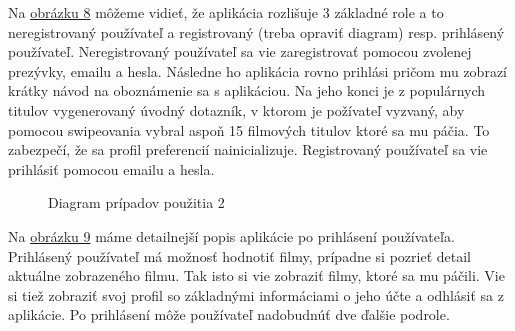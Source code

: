Na \hyperref[usecase1]{obrázku 8} môžeme vidieť, že aplikácia rozlišuje 3 základné role a to neregistrovaný používateľ a registrovaný (treba opraviť diagram) resp. prihlásený používateľ. Neregistrovaný používateľ sa vie zaregistrovať pomocou zvolenej prezývky, emailu a hesla. Následne ho aplikácia rovno prihlási pričom mu zobrazí krátky návod na oboznámenie sa s aplikáciou. Na jeho konci je z populárnych titulov vygenerovaný úvodný dotazník, v ktorom je požívateľ vyzvaný, aby pomocou swipeovania vybral aspoň 15 filmových titulov ktoré sa mu páčia. To zabezpečí, že sa profil preferencií nainicializuje. Registrovaný používateľ sa vie prihlásiť pomocou emailu a hesla.
\pagebreak

\begin{figure}[hbt!]
  \centering  
  \def\stackalignment{c}
           {\scriptsize}
	\caption{Diagram prípadov použitia 2}
  \label{usecase2}
\end{figure}
Na \hyperref[usecase2]{obrázku 9} máme detailnejší popis aplikácie po prihlásení používateľa. Prihlásený používateľ má možnosť hodnotiť filmy, prípadne si pozrieť detail aktuálne zobrazeného filmu. Tak isto si vie zobraziť filmy, ktoré sa mu páčili. Vie si tiež zobraziť svoj profil so základnými informáciami o jeho účte a odhlásiť sa z aplikácie. Po prihlásení môže používateľ nadobudnúť dve ďalšie podrole.

